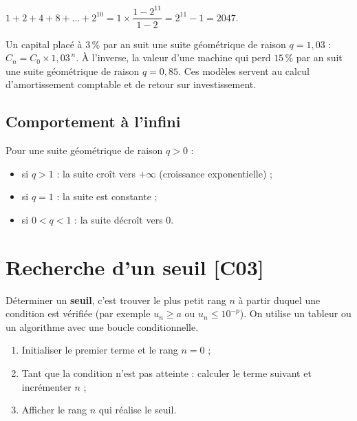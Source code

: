 \documentclass[a4paper,11pt]{article}
\begin{document}
\begin{exemple}
$1 + 2 + 4 + 8 + \dots + 2^{10} = 1 \times \dfrac{1 - 2^{11}}{1 - 2} = 2^{11} - 1 = 2047$.
\end{exemple}

\begin{appliindus}
Un capital placé à $3\,\%$ par an suit une suite géométrique de raison $q = 1{,}03$ : $C_n = C_0 \times 1{,}03^{\,n}$. À l'inverse, la valeur d'une machine qui perd $15\,\%$ par an suit une suite géométrique de raison $q = 0{,}85$. Ces modèles servent au calcul d'amortissement comptable et de retour sur investissement.
\end{appliindus}

\subsection{Comportement à l'infini}

\begin{theoreme}
Pour une suite géométrique de raison $q > 0$ :
\begin{itemize}
  \item si $q > 1$ : la suite croît vers $+\infty$ (croissance exponentielle) ;
  \item si $q = 1$ : la suite est constante ;
  \item si $0 < q < 1$ : la suite décroît vers $0$.
\end{itemize}
\end{theoreme}

\newpage
\section{Recherche d'un seuil \hfill {\normalsize\color{uimmred}[C03]}}

Déterminer un \textbf{seuil}, c'est trouver le plus petit rang $n$ à partir duquel une condition est vérifiée (par exemple $u_n \geq a$ ou $u_n \leq 10^{-p}$). On utilise un tableur ou un algorithme avec une boucle conditionnelle.

\begin{methode}
\begin{enumerate}
  \item Initialiser le premier terme et le rang $n = 0$ ;
  \item Tant que la condition n'est pas atteinte : calculer le terme suivant et incrémenter $n$ ;
  \item Afficher le rang $n$ qui réalise le seuil.
\end{enumerate}
\end{methode}
\end{document}
